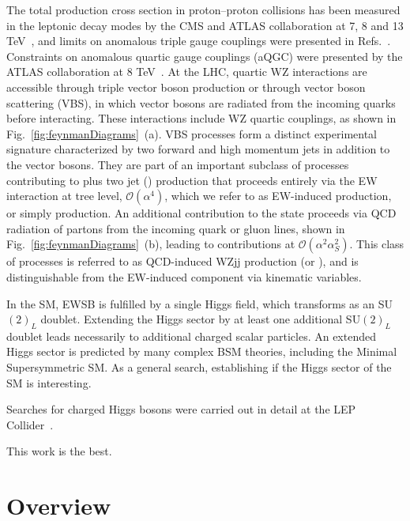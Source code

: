 The total \WZ production cross section in proton--proton collisions 
has been measured in the leptonic decay modes by the CMS and ATLAS collaboration at 
7, 8 and 13 TeV~\cite{Aad:2012twa,Aad:2016ett,Khachatryan:2016tgp,Khachatryan:2016poo}, 
and limits on anomalous triple gauge couplings were presented in Refs.~\cite{Aad:2016ett,Khachatryan:2016poo}. 
Constraints on anomalous quartic gauge couplings (aQGC) were presented by the ATLAS collaboration at 8 TeV~\cite{Aad:2016ett}. 
At the LHC, quartic WZ interactions are accessible through triple vector boson production or through vector boson scattering (VBS), 
in which vector bosons are radiated from the incoming quarks before interacting.
These interactions include WZ quartic couplings, as shown in Fig.~\ref{fig:feynmanDiagrams}~(a). 
VBS processes form a distinct experimental signature characterized by two forward and high momentum jets in addition 
to the vector bosons. They are part of an important subclass of processes contributing to 
\WZ plus two jet (\WZjj) production that proceeds entirely via the EW interaction at tree level,
$\mathcal{O}(\alpha^4)$, which we refer to as EW-induced \WZjj production, or simply \EWWZ production. 
An additional contribution to the \WZjj state proceeds via QCD radiation of partons from 
the incoming quark or gluon lines, shown in Fig.~\ref{fig:feynmanDiagrams}~(b), 
leading to contributions at $\mathcal{O}(\alpha^2\alpha_{S}^2)$.
This class of processes is referred to as QCD-induced WZjj production (or \QCDWZ),
and is distinguishable from the EW-induced component via kinematic variables.

In the SM, EWSB is fulfilled by a single Higgs field, which transforms as an SU$(2)_{L}$ doublet.
Extending the Higgs sector by at least one additional SU$(2)_{L}$ doublet leads necessarily
to additional charged scalar particles. An extended Higgs sector is predicted by many
complex BSM theories, including the Minimal Supersymmetric SM. As a general
search, establishing if the Higgs sector of the SM is interesting.

Searches for charged Higgs bosons were carried out in detail at the LEP Collider~\cite{}.

This work is the best.

\section{Overview}

